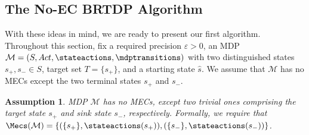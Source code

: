 \documentclass{article}
\newcommand{\MDP}{\mathcal{M}}
\newcommand{\States}{S}
\newcommand{\initialstate}{\hat{s}}
\newcommand{\Actions}{Act}
\newcommand{\finitepath}{\varrho}
\DeclareMathOperator{\val}{\mathcal{V}}
\newcommand{\upperbound}{\mathsf{Up}}
\newcommand{\lowerbound}{\mathsf{Lo}}
\newcommand{\targetstate}{s_+}
\newcommand{\sinkstate}{s_-}
\newcommand{\targetset}{T}
\newcommand{\samplepath}{\textsc{SamplePairs}}
\newcommand{\algoepisode}{\mathsf{e}}
\newtheorem{assumption}{Assumption}
\begin{document}
\subsection{The No-EC BRTDP Algorithm} \label{sec:brtdp_no_ec:algo}

With these ideas in mind, we are ready to present our first algorithm.
Throughout this section, fix a required precision $\varepsilon > 0$, an MDP $\MDP = (\States, \Actions, \stateactions, \mdptransitions)$ with two distinguished states $\targetstate, \sinkstate \in \States$, target set $\targetset = \{\targetstate\}$, and a starting state $\initialstate$.
We assume that $\MDP$ has no MECs except the two terminal states $\targetstate$ and $\sinkstate$.
\begin{assumption} \label{asm:mec_free}
	MDP $\MDP$ has no MECs, except two trivial ones comprising the target state $\targetstate$ and sink state $\sinkstate$, respectively.
	Formally, we require that $\Mecs(\MDP) = \{(\{\targetstate\}, \stateactions(\targetstate)), (\{\sinkstate\}, \stateactions(\sinkstate))\}$.
\end{assumption}
\end{document}
